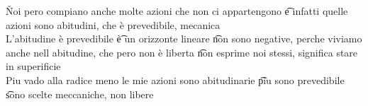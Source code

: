 \documentclass[12pt]{article}
\begin{document}
\v

Noi pero compiano anche molte azioni che non ci appartengono \t e infatti quelle azioni sono abitudini, che è prevedibile, mecanica \\
L'abitudine è prevedibile \t è un orizzonte lineare \t non sono negative, perche viviamo anche nell abitudine, che pero non è liberta \t non esprime noi stessi, significa stare in superificie \\
Piu vado alla radice meno le mie azioni sono abitudinarie \t piu sono prevedibile \t sono scelte meccaniche, non libere
\end{document}
